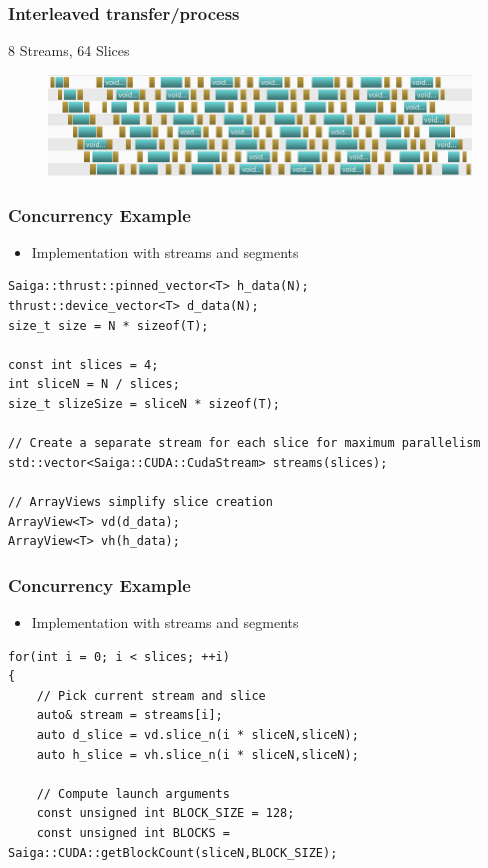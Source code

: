 \documentclass[aspectratio=169,handout]{beamer}
\begin{document}
\begin{frame}[fragile]
\frametitle{Interleaved transfer/process}
8 Streams, 64 Slices
\begin{figure}
	\includegraphics[width=.95\linewidth]{async648}
\end{figure}

\end{frame}




\begin{frame}[fragile]
\frametitle{Concurrency Example}
\begin{itemize}
	\item Implementation with streams and segments
\end{itemize}

\begin{lstlisting}
Saiga::thrust::pinned_vector<T> h_data(N);
thrust::device_vector<T> d_data(N);
size_t size = N * sizeof(T);

const int slices = 4;
int sliceN = N / slices;
size_t slizeSize = sliceN * sizeof(T);

// Create a separate stream for each slice for maximum parallelism
std::vector<Saiga::CUDA::CudaStream> streams(slices);

// ArrayViews simplify slice creation
ArrayView<T> vd(d_data);
ArrayView<T> vh(h_data);
\end{lstlisting}
\end{frame}


\begin{frame}[fragile]
\frametitle{Concurrency Example}
\begin{itemize}
	\item Implementation with streams and segments
\end{itemize}

\begin{lstlisting}
for(int i = 0; i < slices; ++i)
{
	// Pick current stream and slice
	auto& stream = streams[i];
	auto d_slice = vd.slice_n(i * sliceN,sliceN);
	auto h_slice = vh.slice_n(i * sliceN,sliceN);
	
	// Compute launch arguments
	const unsigned int BLOCK_SIZE = 128;
	const unsigned int BLOCKS = Saiga::CUDA::getBlockCount(sliceN,BLOCK_SIZE);
\end{lstlisting}
\end{frame}
\end{document}
